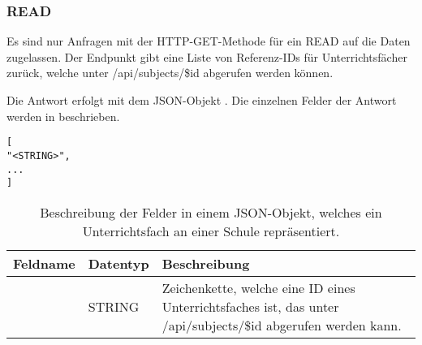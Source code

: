 \subsubsection{READ}
\label{sec:rest:api:schools:subjects:read}
Es sind nur Anfragen mit der HTTP-GET-Methode für ein READ auf die Daten zugelassen.
Der Endpunkt gibt eine Liste von Referenz-IDs für Unterrichtsfächer zurück, welche unter /api/subjects/\$id abgerufen werden können.

Die Antwort erfolgt mit dem JSON-Objekt . 
Die einzelnen Felder der Antwort werden in  beschrieben.


\begin{lstlisting}[caption={JSON-Antwort für einen GET-Aufruf des Pfads /api/schools/\$id/subjects},label={lst:code:rest:api:schools:subjects:read:ret},frame=tlrb]
[
"<STRING>",
...
]
\end{lstlisting}
\begin{longtable}{|p{}|p{}|p{}|}
		\caption{Beschreibung des Feldes in einem JSON-Objekt, welches ein Unterrichtsfach an einer Schule repräsentiert.}
\endfoot
		\caption{Beschreibung der Felder in einem JSON-Objekt, welches ein Unterrichtsfach an einer Schule repräsentiert.}
		\label{tab:rest:api:schools:subjects:read:ret:json}
\endlastfoot 
\hline
			\textbf{Feldname} & \textbf{Datentyp} & \textbf{Beschreibung} \\ \hline
\endhead
 & STRING & Zeichenkette, welche eine ID eines Unterrichtsfaches ist, das unter /api/subjects/\$id abgerufen werden kann. \\ \hline
\end{longtable}

